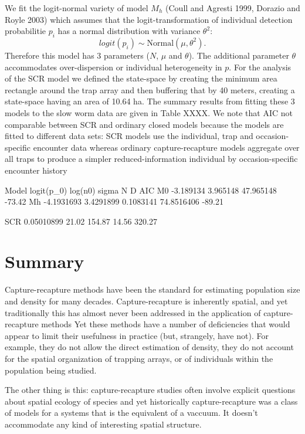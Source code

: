 \documentclass{book}
\begin{document}
We fit the logit-normal variety of model $M_h$ (Coull and Agresti
1999, Dorazio and Royle 2003) which assumes that the
logit-transformation of individual detection probabilitie $p_i$ has a
normal distribution with variance $\theta^2$:
\[
 logit(p_i) \sim \mbox{Normal}(\mu, \theta^2).
\]
Therefore this model has 3 parameters ($N$, $\mu$ and $\theta$).  The
additional parameter $\theta$ accommodates over-dispersion or
individual heterogeneity in $p$. 
For the analysis of the SCR model we defined
 the state-space by creating the minimum area rectangle around the trap array
and then buffering that by 40 meters, creating a state-space having an
area of 10.64 ha. 
The summary results from fitting these 3 models to the slow worm data
are given in Table XXXX. We note that 
AIC not comparable between SCR and ordinary closed models because the
models are fitted to different data sets:
SCR models use the individual, trap and occasion-specific
encounter data whereas ordinary capture-recapture models aggregate
over all traps to produce a simpler reduced-information individual by
occasion-specific encounter history


Model   logit(p_0)  log(n0)  sigma                N     D     AIC
 M0    -3.189134   3.965148                  47.965148      -73.42
 Mh    -4.1931693  3.4291899 0.1083141       74.8516406     -89.21

SCR    0.05010899                      21.02  154.87  14.56  320.27






\section{Summary}

Capture-recapture methods have been the standard for estimating
population size and density for many decades. 
Capture-recapture is inherently spatial, and yet traditionally this
has almost never been addressed in the application of capture-recapture methods
 Yet these methods have
a number of deficiencies that would appear to limit their usefulness
in practice (but, strangely, have not). For example, they do not allow
the direct estimation of density, they do not account for the spatial
organization of trapping arrays, or of individuals within the
population being studied. 

The other thing is this: capture-recapture studies often involve
explicit questions about spatial ecology of species and yet
historically capture-recapture was a class of models for a systems
that is the equivalent of a vaccuum. It doesn't accommodate any kind
of interesting spatial structure.
\end{document}
